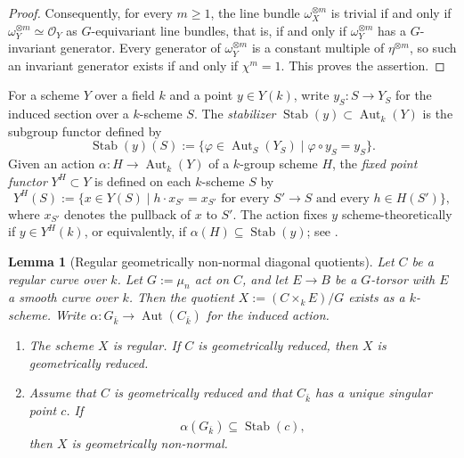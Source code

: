 \documentclass[10pt,abstract=true]{scrartcl}
\numberwithin{equation}{section}
\newtheorem{lemma}[theorem]{Lemma}
\theoremstyle{definition}
\theoremstyle{remark}
\begin{document}
\begin{proof}
  Consequently, for every $m\ge1$, the line bundle $\omega_X^{\otimes m}$ is trivial if and only if $\omega_Y^{\otimes m}\simeq\mathcal O_Y$ as $G$-equivariant line bundles, that is, if and only if $\omega_Y^{\otimes m}$ has a $G$-invariant generator.
  Every generator of $\omega_Y^{\otimes m}$ is a constant multiple of $\eta^{\otimes m}$, so such an invariant generator exists if and only if $\chi^m=1$.
  This proves the assertion.
\end{proof}

\medskip
For a scheme $Y$ over a field $k$ and a point $y\in Y(k)$, write $y_S\colon S\to Y_S$ for the induced section over a $k$-scheme $S$.
The \emph{stabilizer} $\operatorname{Stab}(y)\subset\operatorname{Aut}_k(Y)$ is the subgroup functor defined by
\[
  \operatorname{Stab}(y)(S)
  :=\{\varphi\in\operatorname{Aut}_S(Y_S)\mid\varphi\circ y_S=y_S\}.
\]
Given an action $\alpha\colon H\to\operatorname{Aut}_k(Y)$ of a $k$-group scheme $H$, the \emph{fixed point functor} $Y^H\subset Y$ is defined on each $k$-scheme $S$ by
\[
  Y^H(S):=\{x\in Y(S)\mid h\cdot x_{S'}=x_{S'}
  \text{ for every }S'\to S\text{ and every }h\in H(S')\},
\]
where $x_{S'}$ denotes the pullback of $x$ to $S'$.
The action fixes $y$ scheme-theoretically if $y\in Y^H(k)$, or equivalently, if $\alpha(H)\subseteq\operatorname{Stab}(y)$; see \cite[Definition~2.2.5 and Theorem~2.2.6]{Brion-structure-2017}.

\begin{lemma}[Regular geometrically non-normal diagonal quotients]\label{prop:diagonal-quotient-nonnormal}
  Let $C$ be a regular curve over $k$.
  Let $G:=\mu_n$ act on $C$, and let $E\to B$ be a $G$-torsor with $E$ a smooth curve over $k$.
  Then the quotient $X:=(C\times_kE)/G$ exists as a $k$-scheme.
  Write $\alpha\colon G_{\bar k}\to\operatorname{Aut}(C_{\bar k})$ for the induced action.
  \begin{enumerate}[label=\textup{(\arabic*)}]
    \item The scheme $X$ is regular.
      If $C$ is geometrically reduced, then $X$ is geometrically reduced.
    \item Assume that $C$ is geometrically reduced and that $C_{\bar k}$ has a unique singular point $c$.
      If
      \[
        \alpha(G_{\bar k})\subseteq\operatorname{Stab}(c),
      \]
      then $X$ is geometrically non-normal.
  \end{enumerate}
\end{lemma}
\end{document}
